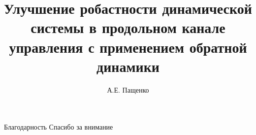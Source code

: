 \documentclass[unicode]{beamer}   %
\title[Дипломная работа]{Улучшение робастности динамической системы в продольном канале управления с применением обратной динамики}
\author{А.Е. Пащенко}
\institute[МАИ]{Московский авиационный институт}
\date{}
\begin{document}
\maketitle








\begin{frame}{Благодарность}
\centering
\huge    %
Спасибо за внимание
\end{frame}
\end{document}
